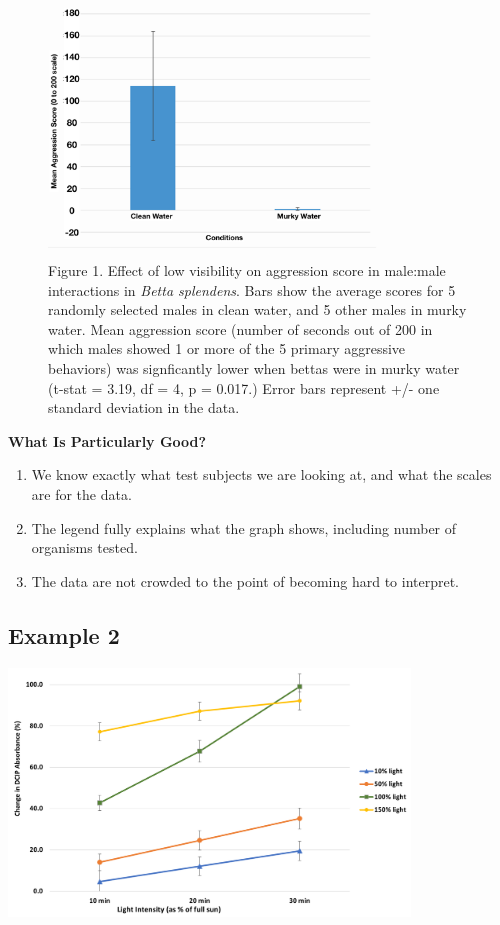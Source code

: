 \documentclass[
]{book}
\providecommand{\tightlist}{%
  \setlength{\itemsep}{0pt}\setlength{\parskip}{0pt}}
\begin{document}
\begin{figure}
\centering
\includegraphics[width=0.8\textwidth,height=\textheight]{images/Clean_plot.png}
\caption{Figure 1. Effect of low visibility on aggression score in male:male interactions in \emph{Betta splendens}. Bars show the average scores for 5 randomly selected males in clean water, and 5 other males in murky water. Mean aggression score (number of seconds out of 200 in which males showed 1 or more of the 5 primary aggressive behaviors) was signficantly lower when bettas were in murky water (t-stat = 3.19, df = 4, p = 0.017.) Error bars represent +/- one standard deviation in the data.}
\end{figure}

\textbf{What Is Particularly Good?}

\begin{enumerate}
\def\labelenumi{\arabic{enumi}.}
\tightlist
\item
  We know exactly what test subjects we are looking at, and what the scales are for the data.
\item
  The legend fully explains what the graph shows, including number of organisms tested.
\item
  The data are not crowded to the point of becoming hard to interpret.
\end{enumerate}

\hypertarget{example-2-11}{%
\subsection{Example 2}\label{example-2-11}}

\includegraphics[width=0.8\textwidth,height=\textheight]{images/DCIP_Spinach.png}
\end{document}
